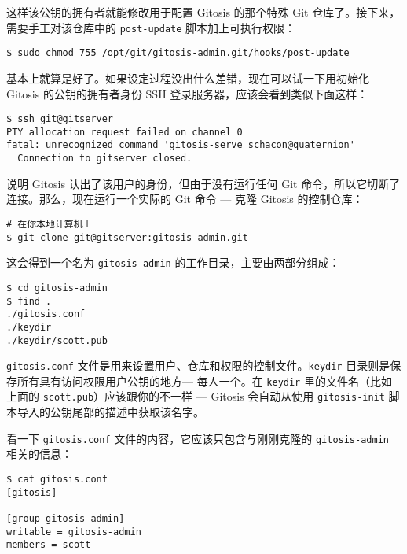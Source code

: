\documentclass[a4paper]{book}
\newcounter{tab}[chapter]
\begin{document}
这样该公钥的拥有者就能修改用于配置 Gitosis 的那个特殊 Git 仓库了。接下来，需要手工对该仓库中的 \texttt{post-update} 脚本加上可执行权限：

\begin{shaded}\begin{verbatim}
$ sudo chmod 755 /opt/git/gitosis-admin.git/hooks/post-update
\end{verbatim}\end{shaded}

基本上就算是好了。如果设定过程没出什么差错，现在可以试一下用初始化 Gitosis 的公钥的拥有者身份 SSH 登录服务器，应该会看到类似下面这样：

\begin{shaded}\begin{verbatim}
$ ssh git@gitserver
PTY allocation request failed on channel 0
fatal: unrecognized command 'gitosis-serve schacon@quaternion'
  Connection to gitserver closed.
\end{verbatim}\end{shaded}

说明 Gitosis 认出了该用户的身份，但由于没有运行任何 Git 命令，所以它切断了连接。那么，现在运行一个实际的 Git 命令 --- 克隆 Gitosis 的控制仓库：

\begin{shaded}\begin{verbatim}
# 在你本地计算机上
$ git clone git@gitserver:gitosis-admin.git
\end{verbatim}\end{shaded}

这会得到一个名为 \texttt{gitosis-admin} 的工作目录，主要由两部分组成：

\begin{shaded}\begin{verbatim}
$ cd gitosis-admin
$ find .
./gitosis.conf
./keydir
./keydir/scott.pub
\end{verbatim}\end{shaded}

\texttt{gitosis.conf} 文件是用来设置用户、仓库和权限的控制文件。\texttt{keydir} 目录则是保存所有具有访问权限用户公钥的地方--- 每人一个。在 \texttt{keydir} 里的文件名（比如上面的 \texttt{scott.pub}）应该跟你的不一样 --- Gitosis 会自动从使用 \texttt{gitosis-init} 脚本导入的公钥尾部的描述中获取该名字。

看一下 \texttt{gitosis.conf} 文件的内容，它应该只包含与刚刚克隆的 \texttt{gitosis-admin} 相关的信息：

\begin{shaded}\begin{verbatim}
$ cat gitosis.conf 
[gitosis]

[group gitosis-admin]
writable = gitosis-admin
members = scott
\end{verbatim}\end{shaded}
\end{document}
